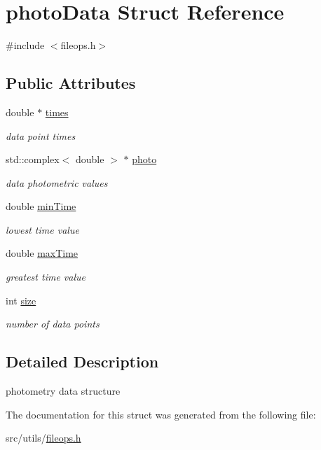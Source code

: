 \hypertarget{structphotoData}{}\section{photo\+Data Struct Reference}
\label{structphotoData}


{\ttfamily \#include $<$fileops.\+h$>$}

\subsection*{Public Attributes}
\begin{DoxyCompactItemize}
\item 
\mbox{\label{structphotoData_aa9c49cd15a21321e010d8c739ee4769e}} 
double $\ast$ \mbox{\hyperlink{structphotoData_aa9c49cd15a21321e010d8c739ee4769e}{times}}
\begin{DoxyCompactList}\small\item\em data point times \end{DoxyCompactList}\item 
\mbox{\label{structphotoData_af0a20af0aa059bb07942c896f7d4b1c2}} 
std\+::complex$<$ double $>$ $\ast$ \mbox{\hyperlink{structphotoData_af0a20af0aa059bb07942c896f7d4b1c2}{photo}}
\begin{DoxyCompactList}\small\item\em data photometric values \end{DoxyCompactList}\item 
\mbox{\label{structphotoData_abb03c075843e116850a75f58bcafc01e}} 
double \mbox{\hyperlink{structphotoData_abb03c075843e116850a75f58bcafc01e}{min\+Time}}
\begin{DoxyCompactList}\small\item\em lowest time value \end{DoxyCompactList}\item 
\mbox{\label{structphotoData_acb7d138ec268b5b699779d819730f280}} 
double \mbox{\hyperlink{structphotoData_acb7d138ec268b5b699779d819730f280}{max\+Time}}
\begin{DoxyCompactList}\small\item\em greatest time value \end{DoxyCompactList}\item 
\mbox{\label{structphotoData_aff95011310c45ddfb7e345a43df7de8b}} 
int \mbox{\hyperlink{structphotoData_aff95011310c45ddfb7e345a43df7de8b}{size}}
\begin{DoxyCompactList}\small\item\em number of data points \end{DoxyCompactList}\end{DoxyCompactItemize}


\subsection{Detailed Description}
photometry data structure 

The documentation for this struct was generated from the following file\+:\begin{DoxyCompactItemize}
\item 
src/utils/\mbox{\hyperlink{fileops_8h}{fileops.\+h}}\end{DoxyCompactItemize}

